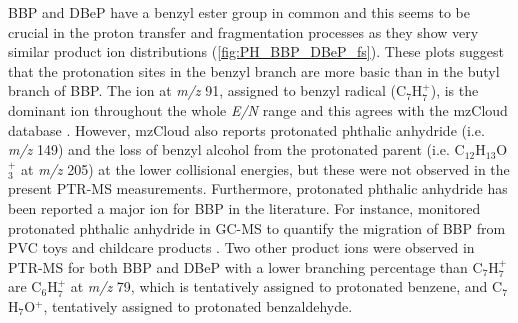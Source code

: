 BBP and DBeP have a benzyl ester group in common and this seems to be crucial in the proton transfer and fragmentation processes as they show very similar product ion distributions (\autoref{fig:PH_BBP_DBeP_fs}). 
These plots suggest that the protonation sites in the benzyl branch are more basic than in the butyl branch  of BBP.
%
The ion at \textit{m/z} 91, assigned to benzyl radical (C$_7$H$_7^+$), is the dominant ion throughout the whole \textit{E/N} range and this agrees with the mzCloud database \cite{mzcloudBBP}.
%
However, mzCloud also reports protonated phthalic anhydride (i.e. \textit{m/z} 149) and the loss of benzyl alcohol from the protonated parent (i.e. C$_{12}$H$_{13}$O$_3^+$ at \textit{m/z} 205) at the lower collisional energies, but these were not observed in the present PTR-MS measurements. 
%
Furthermore, protonated phthalic anhydride has been reported a major ion for BBP in the literature. For instance, \citeauthor{earls2003gas} monitored protonated phthalic anhydride  in GC-MS to quantify the migration of BBP from PVC toys and childcare products \cite{earls2003gas}.
%
Two other product ions were observed in PTR-MS for both BBP and DBeP with a lower branching percentage than C$_7$H$_7^+$ are
C$_6$H$_7^+$ at \textit{m/z} 79, which is tentatively assigned to protonated benzene, 
and C$_7$H$_7$O$^+$, tentatively assigned to protonated benzaldehyde.

